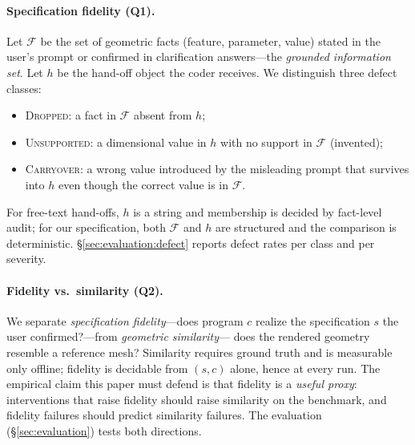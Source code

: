 \paragraph{Specification fidelity (Q1).}
Let $\mathcal{F}$ be the set of geometric facts (feature, parameter, value)
stated in the user's prompt or confirmed in clarification answers---the
\emph{grounded information set}. Let $h$ be the hand-off object the coder
receives. We distinguish three defect classes:
\begin{itemize}
  \item \textsc{Dropped}: a fact in $\mathcal{F}$ absent from $h$;
  \item \textsc{Unsupported}: a dimensional value in $h$ with no support in
  $\mathcal{F}$ (invented);
  \item \textsc{Carryover}: a wrong value introduced by the misleading
  prompt that survives into $h$ even though the correct value is in
  $\mathcal{F}$.
\end{itemize}
For free-text hand-offs, $h$ is a string and membership is decided by
fact-level audit; for our specification, both $\mathcal{F}$ and $h$ are
structured and the comparison is deterministic. \S\ref{sec:evaluation:defect}
reports defect rates per class and per severity.

\paragraph{Fidelity vs.\ similarity (Q2).}
We separate \emph{specification fidelity}---does program $c$ realize the
specification $s$ the user confirmed?---from \emph{geometric similarity}---
does the rendered geometry resemble a reference mesh? Similarity requires
ground truth and is measurable only offline; fidelity is decidable from
$(s,c)$ alone, hence at every run. The empirical claim this paper must defend
is that fidelity is a \emph{useful proxy}: interventions that raise fidelity
should raise similarity on the benchmark, and fidelity failures should
predict similarity failures. The evaluation
(\S\ref{sec:evaluation}) tests both directions.

